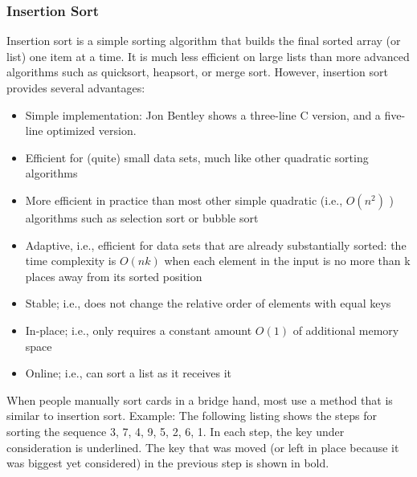 \documentclass[12pt,a4paper]{book}
\begin{document}
\subsubsection{Insertion Sort}
Insertion sort is a simple sorting algorithm that builds the final sorted array (or list) one item at a time. It is much less efficient on large lists than more advanced algorithms such as quicksort, heapsort, or merge sort. However, insertion sort provides several advantages:
\begin{itemize}
\item Simple implementation: Jon Bentley shows a three-line C version, and a five-line optimized version.
\item Efficient for (quite) small data sets, much like other quadratic sorting algorithms
\item More efficient in practice than most other simple quadratic (i.e., $O(n^{2})$ ) algorithms such as selection sort or bubble sort
\item Adaptive, i.e., efficient for data sets that are already substantially sorted: the time complexity is $O(nk)$ when each element in the input is no more than k places away from its sorted position
\item Stable; i.e., does not change the relative order of elements with equal keys
\item In-place; i.e., only requires a constant amount $O(1)$ of additional memory space
\item Online; i.e., can sort a list as it receives it
\end{itemize}
When people manually sort cards in a bridge hand, most use a method that is similar to insertion sort.
Example: The following listing shows the steps for sorting the sequence {3, 7, 4, 9, 5, 2, 6, 1}. In each step, the key under consideration is underlined. The key that was moved (or left in place because it was biggest yet considered) in the previous step is shown in bold.
\end{document}
